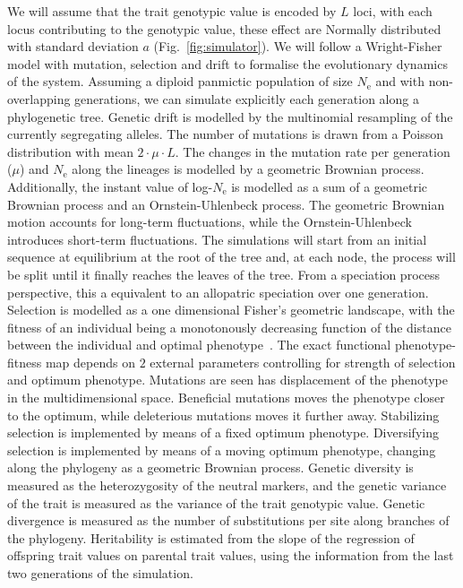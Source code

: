\documentclass{article}
\newcommand{\Multiply}{\cdot}
\newcommand{\Ne}{N_{\text{e}}}
\newcommand{\MutationRate}{\mu}
\newcommand{\NbrLoci}{L}
\begin{document}
We will assume that the trait genotypic value is encoded by $\NbrLoci$ loci, with each locus contributing to the genotypic value, these effect are Normally distributed with standard deviation $a$ (Fig.~\ref{fig:simulator}).
We will follow a Wright-Fisher model with mutation, selection and drift to formalise the evolutionary dynamics of the system.
Assuming a diploid panmictic population of size $\Ne$ and with non-overlapping generations, we can simulate explicitly each generation along a phylogenetic tree.
Genetic drift is modelled by the multinomial resampling of the currently segregating alleles.
The number of mutations is drawn from a Poisson distribution with mean $2 \Multiply \MutationRate \Multiply \NbrLoci $.
The changes in the mutation rate per generation ($\MutationRate$) and $\Ne$ along the lineages is modelled by a geometric Brownian process.
Additionally, the instant value of log-$\Ne$ is modelled as a sum of a geometric Brownian process and an Ornstein-Uhlenbeck process.
The geometric Brownian motion accounts for long-term fluctuations, while the Ornstein-Uhlenbeck introduces short-term fluctuations.
The simulations will start from an initial sequence at equilibrium at the root of the tree and, at each node, the process will be split until it finally reaches the leaves of the tree.
From a speciation process perspective, this a equivalent to an allopatric speciation over one generation.
Selection is modelled as a one dimensional Fisher's geometric landscape, with the fitness of an individual being a monotonously decreasing function of the distance between the individual and optimal phenotype~\cite{tenaillon_utility_2014,blanquart_epistasis_2016}.
The exact functional phenotype-fitness map depends on $2$ external parameters controlling for strength of selection and optimum phenotype.
Mutations are seen has displacement of the phenotype in the multidimensional space.
Beneficial mutations moves the phenotype closer to the optimum, while deleterious mutations moves it further away.
Stabilizing selection is implemented by means of a fixed optimum phenotype.
Diversifying selection is implemented by means of a moving optimum phenotype, changing along the phylogeny as a geometric Brownian process.
Genetic diversity is measured as the heterozygosity of the neutral markers, and the genetic variance of the trait is measured as the variance of the trait genotypic value.
Genetic divergence is measured as the number of substitutions per site along branches of the phylogeny.
Heritability is estimated from the slope of the regression of offspring trait values on parental trait values\cite{lynch_genetics_1998}, using the information from the last two generations of the simulation.
\end{document}
